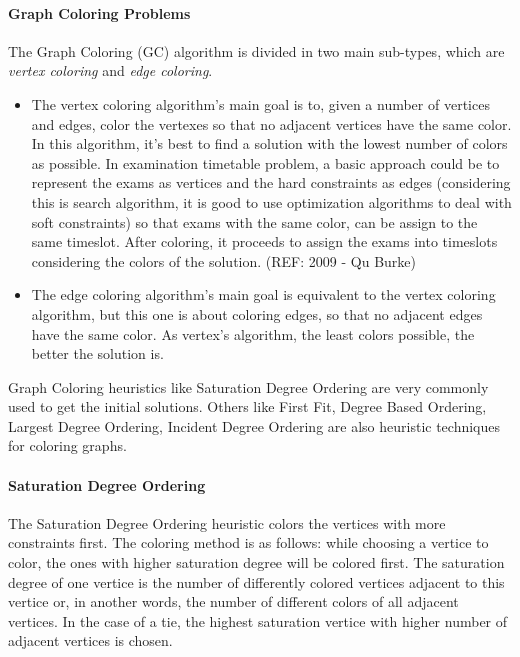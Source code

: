 \paragraph{Graph Coloring Problems}
The Graph Coloring (GC) algorithm is divided in two main sub-types, which are \textit{vertex coloring} and \textit{edge coloring}.
\begin{itemize}
  \item The vertex coloring algorithm's main goal is to, given a number of vertices and edges, color the vertexes so that no adjacent vertices have the same color. In this algorithm, it's best to find a solution with the lowest number of colors as possible. In examination timetable problem, a basic approach could be to represent the exams as vertices and the hard constraints as edges (considering this is search algorithm, it is good to use optimization algorithms to deal with soft constraints) so that exams with the same color, can be assign to the same timeslot. After coloring, it proceeds to assign the exams into timeslots considering the colors of the solution. (REF: 2009 - Qu Burke)
  \item The edge coloring algorithm's main goal is equivalent to the vertex coloring algorithm, but this one is about coloring edges, so that no adjacent edges have the same color. As vertex's algorithm, the least colors possible, the better the solution is.
\end{itemize}

Graph Coloring heuristics like Saturation Degree Ordering are very commonly used to get the initial solutions. Others like First Fit, Degree Based Ordering, Largest Degree Ordering, Incident Degree Ordering are also heuristic techniques for coloring graphs.\\

\paragraph{Saturation Degree Ordering}
The Saturation Degree Ordering heuristic colors the vertices with more constraints first. The coloring method is as follows: while choosing a vertice to color, the ones with higher saturation degree will be colored first. The saturation degree of one vertice is the number of differently colored vertices adjacent to this vertice or, in another words, the number of different colors of all adjacent vertices. In the case of a tie, the highest saturation vertice with higher number of adjacent vertices is chosen.

